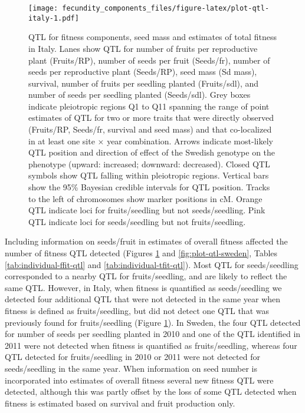 \documentclass[]{article}
\begin{document}
\begin{figure}
\centering
\texttt{[image: fecundity\_components\_files/figure-latex/plot-qtl-italy-1.pdf]}
\caption{\label{fig:plot-qtl-italy}QTL for fitness components, seed mass and estimates of total fitness in Italy. Lanes show QTL for number of fruits per reproductive plant (Fruits/RP), number of seeds per fruit (Seeds/fr), number of seeds per reproductive plant (Seeds/RP), seed mass (Sd mass), survival, number of fruits per seedling planted (Fruits/sdl), and number of seeds per seedling planted (Seeds/sdl). Grey boxes indicate pleiotropic regions Q1 to Q11 spanning the range of point estimates of QTL for two or more traits that were directly observed (Fruits/RP, Seeds/fr, survival and seed mass) and that co-localized in at least one site × year combination. Arrows indicate most-likely QTL position and direction of effect of the Swedish genotype on the phenotype (upward: increased; downward: decreased). Closed QTL symbols show QTL falling within pleiotropic regions. Vertical bars show the 95\% Bayesian credible intervals for QTL position. Tracks to the left of chromosomes show marker positions in cM. Orange QTL indicate loci for fruits/seedling but not seeds/seedling. Pink QTL indicate loci for seeds/seedling but not fruits/seedling.}
\end{figure}

Including information on seeds/fruit in estimates of overall fitness affected the number of fitness QTL detected (Figures \ref{fig:plot-qtl-italy} and \ref{fig:plot-qtl-sweden}, Tables \ref{tab:individual-ffit-qtl} and \ref{tab:individual-tfit-qtl}). Most QTL for seeds/seedling corresponded to a nearby QTL for fruits/seedling, and are likely to reflect the same QTL. However, in Italy, when fitness is quantified as seeds/seedling we detected four additional QTL that were not detected in the same year when fitness is defined as fruits/seedling, but did not detect one QTL that was previously found for fruits/seedling (Figure \ref{fig:plot-qtl-italy}). In Sweden, the four QTL detected for number of seeds per seedling planted in 2010 and one of the QTL identified in 2011 were not detected when fitness is quantified as fruits/seedling, whereas four QTL detected for fruits/seedling in 2010 or 2011 were not detected for seeds/seedling in the same year. When information on seed number is incorporated into estimates of overall fitness several new fitness QTL were detected, although this was partly offset by the loss of some QTL detected when fitness is estimated based on survival and fruit production only.
\end{document}
